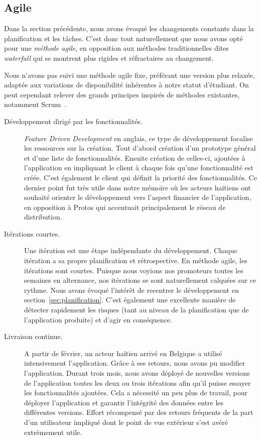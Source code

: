 \documentclass{EPL-master-thesis-covers-FR}
\begin{document}
			\subsection*{Agile}

				Dans la section précédente, nous avons évoqué les changements constants dans la planification et les tâches. C'est donc tout naturellement que nous avons opté pour une \emph{méthode agile}, en opposition aux méthodes traditionnelles dites \emph{waterfall} qui se montrent plus rigides et réfractaires au changement.

				Nous n'avons pas suivi une méthode agile fixe, préférant une version plus relaxée, adaptée aux variations de disponibilité inhérentes à notre statut d'étudiant. On peut cependant relever des grands principes inspirés de méthodes existantes, notamment Scrum~\cite{ref:scrum}.

				\begin{description}
					\item[Développement dirigé par les fonctionnalités.] \emph{Feature Driven Development} en anglais, ce type de développement focalise les ressources sur la création. Tout d'abord création d'un prototype général et d'une liste de fonctionnalités. Ensuite création de celles-ci, ajoutées à l'application en impliquant le client à chaque fois qu'une fonctionnalité est créée. C'est également le client qui définit la priorité des fonctionnalités. Ce dernier point fut très utile dans notre mémoire où les acteurs haïtiens ont souhaité orienter le développement vers l'aspect financier de l'application, en opposition à Protos qui accentuait principalement le réseau de distribution.

					\item[Itérations courtes.] Une itération est une étape indépendante du développement. Chaque itération a sa propre planification et rétrospective. En méthode agile, les itérations sont courtes. Puisque nous voyions nos promoteurs toutes les semaines en alternance, nos itérations se sont naturellement calquées sur ce rythme. Nous avons évoqué l'intérêt de recentrer le développement en section~\ref{sec:planification}. C'est également une excellente manière de détecter rapidement les risques (tant au niveau de la planification que de l'application produite) et d'agir en conséquence.

					\item[Livraison continue.] A partir de février, un acteur haïtien arrivé en Belgique a utilisé intensivement l'application. Grâce à ses retours, nous avons pu modifier l'application. Durant trois mois, nous avons déployé de nouvelles versions de l'application toutes les deux ou trois itérations afin qu'il puisse essayer les fonctionnalités ajoutées. Cela a nécessité un peu plus de travail, pour déployer l'application et garantir l'intégrité des données entre les différentes versions. Effort récompensé par des retours fréquents de la part d'un utilisateur impliqué dont le point de vue extérieur s'est avéré extrèmement utile.
				\end{description}
\end{document}
